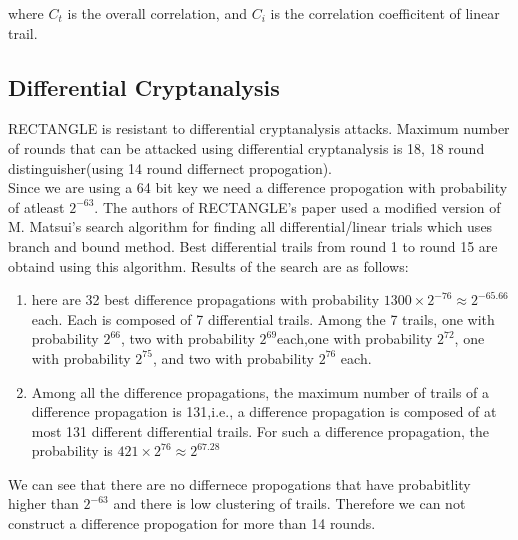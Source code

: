 \documentclass[final]{transcrypto}
\begin{document}
where $C_t$ is the overall correlation, and $C_i$ is the correlation coefficitent of linear trail.
\subsection{Differential Cryptanalysis}
RECTANGLE is resistant to differential cryptanalysis attacks. Maximum number of rounds that can be attacked using differential cryptanalysis is 18, 18 round distinguisher(using 14 round differnect propogation).\\
Since we are using a 64 bit key we need a difference propogation with probability of atleast $2^{-63}$.
The authors of RECTANGLE's paper used a modified version of M. Matsui's search algorithm for finding all differential/linear trials which uses branch and bound method. Best differential trails from round 1 to round 15 are obtaind using this algorithm. Results of the search are as follows:
\begin{enumerate}
 \item here are 32 best difference propagations with probability $1300\times 2^{-76}\approx 2^{-65.66}$ each. Each is composed of 7 differential trails. Among the 7 trails, one with probability $2^{66}$, two with probability $2^{69}$each,one with probability $2^{72}$, one with probability $2^{75}$, and two with probability $2^{76}$ each.
    \item Among all the difference propagations, the maximum number of trails of a difference propagation is 131,i.e., a difference propagation is composed of at most 131 different differential trails. For such a difference propagation, the probability is $421\times 2^{76}\approx 2^{67.28}$

\end{enumerate}
We can see that there are no differnece propogations that have probabitlity higher than $2^{-63}$ and there is low clustering of trails. Therefore we can not construct a difference propogation for more than 14 rounds.
\end{document}

